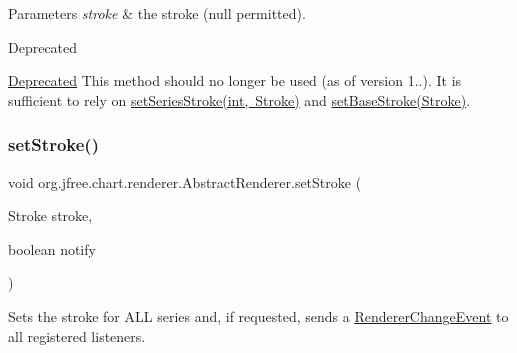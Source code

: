 \begin{DoxyParams}{Parameters}
{\em stroke} & the stroke ({\ttfamily null} permitted).\\
\hline
\end{DoxyParams}
\begin{DoxyRefDesc}{Deprecated}
\item[\mbox{\hyperlink{deprecated__deprecated000122}{Deprecated}}]This method should no longer be used (as of version 1..). It is sufficient to rely on \mbox{\hyperlink{classorg_1_1jfree_1_1chart_1_1renderer_1_1_abstract_renderer_a3cc8ebf3993621a79db959209be1b184}{set\+Series\+Stroke(int, Stroke)}} and \mbox{\hyperlink{classorg_1_1jfree_1_1chart_1_1renderer_1_1_abstract_renderer_a33600c32414c464c6394827d61f9b374}{set\+Base\+Stroke(\+Stroke)}}. \end{DoxyRefDesc}
\mbox{\label{classorg_1_1jfree_1_1chart_1_1renderer_1_1_abstract_renderer_a25c9ae10446e8574ea8667b18e8cdae4}} 
\subsubsection{\texorpdfstring{set\+Stroke()}{setStroke()}\hspace{0.1cm}{\footnotesize\ttfamily [2/2]}}
{\footnotesize\ttfamily void org.\+jfree.\+chart.\+renderer.\+Abstract\+Renderer.\+set\+Stroke (\begin{DoxyParamCaption}\item[{Stroke}]{stroke,  }\item[{boolean}]{notify }\end{DoxyParamCaption})}

Sets the stroke for A\+LL series and, if requested, sends a \mbox{\hyperlink{}{Renderer\+Change\+Event}} to all registered listeners.


